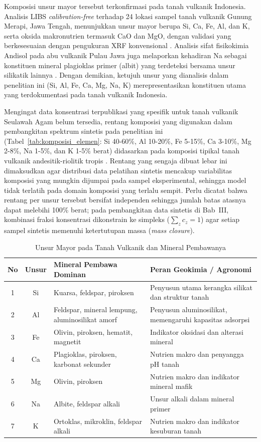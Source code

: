 Komposisi unsur mayor tersebut terkonfirmasi pada tanah vulkanik Indonesia. Analisis LIBS \textit{calibration-free} terhadap 24 lokasi sampel tanah vulkanik Gunung Merapi, Jawa Tengah, menunjukkan unsur mayor berupa Si, Ca, Fe, Al, dan K, serta oksida makronutrien termasuk CaO dan MgO, dengan validasi yang berkesesuaian dengan pengukuran XRF konvensional \citep{khumaeni_analysis_2025}. Analisis sifat fisikokimia Andisol pada abu vulkanik Pulau Jawa juga melaporkan kehadiran Na sebagai konstituen mineral plagioklas primer (albit) yang terdeteksi bersama unsur silikatik lainnya \citep{ranst_andisols_2002}. Dengan demikian, ketujuh unsur yang dianalisis dalam penelitian ini (Si, Al, Fe, Ca, Mg, Na, K) merepresentasikan konstituen utama yang terdokumentasi pada tanah vulkanik Indonesia.

Mengingat data konsentrasi terpublikasi yang spesifik untuk tanah vulkanik Seulawah Agam belum tersedia, rentang komposisi yang digunakan dalam pembangkitan spektrum sintetis pada penelitian ini (Tabel~\ref{tab:komposisi_elemen}: Si 40-60\%, Al 10-20\%, Fe 5-15\%, Ca 3-10\%, Mg 2-8\%, Na 1-5\%, dan K 1-5\% berat) didasarkan pada komposisi tipikal tanah vulkanik andesitik-riolitik tropis \citep{khumaeni_analysis_2025, ranst_andisols_2002}. Rentang yang sengaja dibuat lebar ini dimaksudkan agar distribusi data pelatihan sintetis mencakup variabilitas komposisi yang mungkin dijumpai pada sampel eksperimental, sehingga model tidak terlatih pada domain komposisi yang terlalu sempit. Perlu dicatat bahwa rentang per unsur tersebut bersifat independen sehingga jumlah batas atasnya dapat melebihi 100\% berat; pada pembangkitan data sintetis di Bab~III, kombinasi fraksi konsentrasi dikonstrain ke simpleks ($\sum_z c_z = 1$) agar setiap sampel sintetis memenuhi ketertutupan massa (\textit{mass closure}).

\begin{table}[htbp]
\centering
\caption{Unsur Mayor pada Tanah Vulkanik dan Mineral Pembawanya}
\label{tab:unsur_mayor_vulkanik}
\small
\begin{tabular}{|c|c|p{4cm}|p{4cm}|}
\hline
No & Unsur & Mineral Pembawa Dominan & Peran Geokimia / Agronomi \\
\hline
1 & Si & Kuarsa, feldspar, piroksen & Penyusun utama kerangka silikat dan struktur tanah \\
\hline
2 & Al & Feldspar, mineral lempung, aluminosilikat amorf & Penyusun aluminosilikat, memengaruhi kapasitas adsorpsi \\
\hline
3 & Fe & Olivin, piroksen, hematit, magnetit & Indikator oksidasi dan alterasi mineral \\
\hline
4 & Ca & Plagioklas, piroksen, karbonat sekunder & Nutrien makro dan penyangga pH tanah \\
\hline
5 & Mg & Olivin, piroksen & Nutrien makro dan indikator mineral mafik \\
\hline
6 & Na & Albite, feldspar alkali & Unsur alkali dalam mineral primer \\
\hline
7 & K & Ortoklas, mikroklin, feldspar alkali & Nutrien makro dan indikator kesuburan tanah \\
\hline
\end{tabular}
\end{table}

